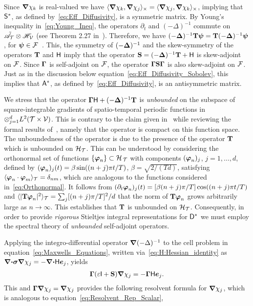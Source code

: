\documentclass[amsa]{ipart}
\begin{document}
  
Since $\mbox{\boldmath${\nabla}$}\chi_k$ is real-valued we have 
$\langle\mbox{\boldmath${\nabla}$}\chi_k,\mbox{\boldmath${\nabla}$}\chi_j\rangle_\times=\langle\mbox{\boldmath${\nabla}$}\chi_j,\mbox{\boldmath${\nabla}$}\chi_k\rangle_\times$, implying that
$\mathsf{S}^*$, as defined by~\eqref{eq:Eff_Diffusivity}, is a symmetric
matrix. By Young's inequality  
in~\eqref{eq:Young_Ineq}, the operators $\partial_t$ and $(-\Delta)^{-1}$
commute on $\tilde{\mathscr{A}}_{\mathcal{T}}\otimes\mathscr{H}_{\mathcal{V}}$ (see Theorem 2.27
in~\cite{Folland:99:RealAnalysis}). Therefore,  we have
$(-\mbox{\boldmath${\Delta}$})^{-1}\mathbf{T}\boldsymbol{\psi}=\mathbf{T}(-\mbox{\boldmath${\Delta}$})^{-1}\boldsymbol{\psi}$, for
$\boldsymbol{\psi}\in\mathcal{F}$~\cite{Folland:99:RealAnalysis,Stakgold:BVP:2000}. This,
the symmetry of $(-\mbox{\boldmath${\Delta}$})^{-1}$ and the skew-symmetry of the
operators $\mathbf{T}$ and $\mathsf{H}$ imply that the operator 
$\mathbf{S}=(-\mbox{\boldmath${\Delta}$})^{-1}\mathbf{T}+\mathsf{H}$ is skew-adjoint on
$\mathcal{F}$. Since $\mbox{\boldmath${\Gamma}$}$ is self-adjoint on $\mathcal{F}$, the operator
$\mbox{\boldmath${\Gamma}$}\mathbf{S}\mbox{\boldmath${\Gamma}$}$ is also skew-adjoint on $\mathcal{F}$. Just as in the
discussion below equation~\eqref{eq:Eff_Diffusivity_Sobolev}, this
implies that $\mathsf{A}^*$, as defined by~\eqref{eq:Eff_Diffusivity}, is an
antisymmetric matrix.



We stress that the operator $\mbox{\boldmath${\Gamma}$}\mathsf{H}+(-\mbox{\boldmath${\Delta}$})^{-1}\mathbf{T}$ is
\emph{unbounded} on the subspace of square-integrable gradients of
spatio-temporal periodic functions in $\otimes_{j=1}^dL^2(\mathcal{T}\times\mathcal{V})$. This is
contrary to the claim given in~\cite{Majda:Kramer:1999:book} while 
reviewing the formal results of~\cite{Avellaneda:PRE:3249}, namely
that the operator is compact on this function space. The unboundedness
of the operator is due to the presence of the 
operator $\mathbf{T}$ which is unbounded on $\mathcal{H}_{\mathcal{T}}$. This can be
understood by considering the orthonormal set of functions
$\{\boldsymbol{\varphi}_n\}\subset\mathcal{H}_{\,\mathcal{T}}$ with components $(\boldsymbol{\varphi}_n)_j$, $j=1,\ldots,d$, 
defined by $(\boldsymbol{\varphi}_n)_j(t)=\beta\sin((n+j)\pi t/T)$, $\beta=\sqrt{2/(Td)}$,
satisfying $\langle\boldsymbol{\varphi}_n\cdot\boldsymbol{\varphi}_m\rangle_{\mathcal{T}}=\delta_{nm}$, which are analogous to the
functions considered in~\eqref{eq:Orthonormal}. It follows from
$(\partial_t\boldsymbol{\varphi}_n)_j(t)=[\beta(n+j)\pi/T]\cos((n+j)\pi t/T)$ and
$\langle|\mathbf{T}\boldsymbol{\varphi}_n|^2\rangle_{\mathcal{T}} =\sum_j[(n+j)\pi/T]^2/d$ that the norm of
$\mathbf{T}\boldsymbol{\varphi}_n$ grows arbitrarily large as $n\to\infty$. This establishes
that $\mathbf{T}$ is unbounded on $\mathcal{H}_{\mathcal{T}}$.  Consequently, in
order to provide \emph{rigorous} Stieltjes integral representations
for $\mathsf{D}^*$ we  must employ the spectral theory of \emph{unbounded}
self-adjoint operators. 


Applying the integro-differential operator $\mbox{\boldmath${\nabla}$}(-\Delta)^{-1}$ to the
cell problem in equation~\eqref{eq:Maxwells_Equations}, written
via~\eqref{eq:H:Hessian_identity} as
$\mbox{\boldmath${\nabla}$}\mbox{\boldmath${\cdot}$}\mbox{\boldmath${\sigma}$}\mbox{\boldmath${\nabla}$}\chi_j=-\mbox{\boldmath${\nabla}$}\mbox{\boldmath${\cdot}$}\mathsf{H}\boldsymbol{e}_j$, yields 
%
\begin{align}\label{eq:Pre_Resolvent}
  \bGamma(\varepsilon\Ib+\Sb)\bnabla \chi_j=-\bGamma\Hm\vece_j.
\end{align}
%
This and $\mbox{\boldmath${\Gamma}$}\mbox{\boldmath${\nabla}$}\chi_j=\mbox{\boldmath${\nabla}$}\chi_j$ provides the
following resolvent formula for $\mbox{\boldmath${\nabla}$}\chi_j$, which is analogous to 
equation~\eqref{eq:Resolvent_Rep_Scalar},
\end{document}
